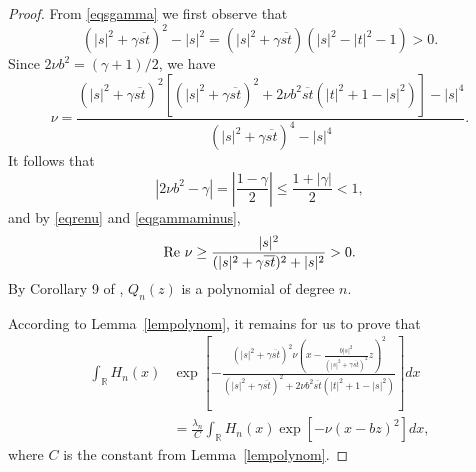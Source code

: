 \documentclass[reqno]{amsart}
\newcommand{\R}{{\mathbb R}}
\newcommand{\inr}{\int_{\R}}
\DeclareMathOperator{\re}{{\rm Re}\,}
\begin{document}
\begin{proof}
From \eqref{eqsgamma} we first observe that
\begin{equation}\label{eqgammaminus}
    \left(|s|^2+\gamma{\overline{st}}\right)^2-|s|^2
=(|s|^2+\gamma{\overline{st}})(|s|^2-|t|^2-1)>0.
\end{equation}
Since $2\nu b^2=(\gamma+1)/2$, we have
$$\nu=\frac {(|s|^2+\gamma{\overline{st}})^{2}\left[(|s|^2+
\gamma{\overline{st}})^2+2\nu b^2{\overline{st}}
(|t|^2+1-|s|^2)\right]-|s|^4}{(|s|^2
+\gamma{\overline{st}})^{4}-|s|^4}.$$
It follows that
$$|2\nu b^2-\gamma|=\left|\frac{1-\gamma}2\right|
\le\frac{1+|\gamma|}2<1,$$
and by \eqref{eqrenu} and \eqref{eqgammaminus},
\begin{equation}\label{eqIRenu}
\re\nu\geq\frac {|s|^2}{(|s|^2+\gamma{\overline{st}})^{2}+|s|^2}>0.
\end{equation}
By Corollary 9 of \cite{DZ3}, $Q_n(z)$ is a polynomial of degree $n$.

According to Lemma~\ref{lempolynom}, it remains for us to prove that
\begin{align}\label{eqintH}
\inr H_n(x)&\exp\left[-\frac{(|s|^2+\gamma{\overline{st}})^{2}\nu
\left(x-\frac{b|s|^2}{\left(|s|^2+\gamma{\overline{st}}\right)^2}z
\right)^2}{(|s|^2+\gamma{\overline{st}})^2+2\nu b^2{\overline{st}}
(|t|^2+1-|s|^2)} \right]dx\nonumber\\[8pt]
&=\frac{\lambda_n}{C}\inr H_n(x)\exp\left[-\nu(x-bz)^2\right]dx,
\end{align}
where $C$ is the constant from Lemma~\ref{lempolynom}.


\end{proof}
\end{document}
